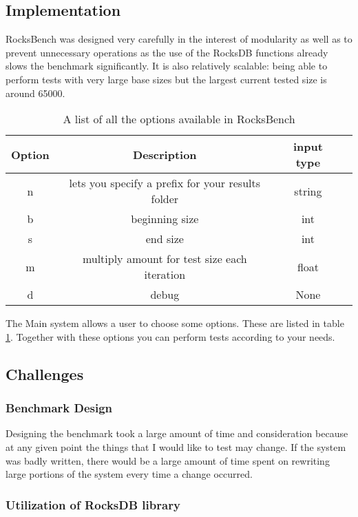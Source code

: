 \documentclass[twocolumn,11pt]{article}
\begin{document}
\subsection{Implementation}

RocksBench was designed very carefully in the interest of modularity as well as
to prevent unnecessary operations as the use of the RocksDB functions already
slows the benchmark significantly. It is also relatively scalable: being able to
perform tests with very large base sizes but the largest current tested size is
around 65000.

\begin{table}[h!]
  \begin{tabular}{ |c|c|c|c| }
    \hline
    Option & Description & input type \\
    \hline \hline
    n & lets you specify a prefix for your results folder & string \\ \hline
    b & beginning size & int \\ \hline
    s & end size & int \\ \hline
    m & multiply amount for test size each iteration & float \\ \hline
    d & debug & None \\ \hline
  \end{tabular}
  \caption{A list of all the options available in RocksBench}
  \label{tab:RocksBench_options}
\end{table}

The Main system allows a user to choose some options. These are listed in table
\ref{tab:RocksBench_options}. Together with these options you can perform tests
according to your needs.

\subsection{Challenges}

\subsubsection{Benchmark Design}

Designing the benchmark took a large amount of time and consideration because at
any given point the things that I would like to test may change. If the system
was badly written, there would be a large amount of time spent on rewriting
large portions of the system every time a change occurred.

\subsubsection{Utilization of RocksDB library}
\end{document}
